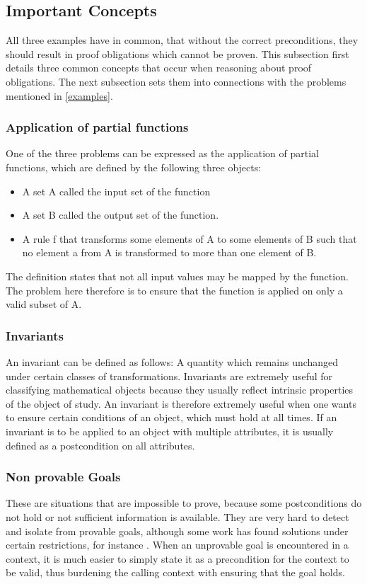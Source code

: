 \subsection{Important Concepts}
All three examples have in common, that without the correct preconditions, they should result in proof obligations which cannot be proven.
This subsection first details three common concepts that occur when reasoning about proof obligations. The next subsection sets them into connections with the problems mentioned in \ref{examples}.
\subsubsection{Application of partial functions} \label{partial function}
One of the three problems can be expressed as the application of partial functions, which are defined by the following three objects:
\begin{itemize}
	\item A set A called the input set of the function
	\item A set B called the output set of the function.
	\item A rule f that transforms some elements of A to some elements of B such that no element a from A is transformed to more than one element of B.\cite[197]{khoussainov}
\end{itemize}
The definition states that not all input values may be mapped by the function. The problem here therefore is to ensure that the function is applied on only a valid subset of A.
\subsubsection{Invariants} \label{invariants}
An invariant can be defined as follows: A quantity which remains unchanged under certain classes of transformations. Invariants are extremely useful for classifying mathematical objects because they usually reflect intrinsic properties of the object of study.\cite[282ff]{hunt}\newline
An invariant is therefore extremely useful when one wants to ensure certain conditions of an object, which must hold at all times. If an invariant is to be applied to an object with multiple attributes, it is usually defined as a postcondition on all attributes. 
\subsubsection{Non provable Goals} \label{non provable goal}
These are situations that are impossible to prove, because some postconditions do not hold or not sufficient information is available. They are very hard to detect and isolate from provable goals, although some work has found solutions under certain restrictions, for instance \cite{goals}. When an unprovable goal is encountered in a context, it is much easier to simply state it as a precondition for the context to be valid, thus burdening the calling context with ensuring that the goal holds. 

